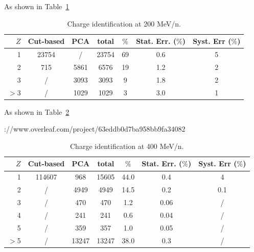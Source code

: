 \documentclass[utf8]{frontiersFPHY} %
\begin{document}
As shown in Table~\ref{tab:Charge_id_200}
%
\begin {table}
	\footnotesize
    \centering
    \caption{Charge identification at 200 MeV/n.}
    \hfill
    \begin{center}
    \begin{tabular}{r|cccccc} 
    \toprule
    \textbf{$Z$}   &  \textbf{Cut-based}   &   \textbf{PCA}   &   \textbf{total}   &   \textbf{$\%$} &   \textbf{Stat. Err. ($\%$)} & \textbf{Syst. Err ($\%$)}   \\
    \midrule
    1  &   23754   &   / &   23754   &  69 &  0.6 &  5 \\
    2  &   715  &   5861   &   6576  &  19 &  1.2 &  2 \\
    3  &   /   &   3093    &   3093   &  9 &  1.8 &  2 \\
    $>$3 & /   &   1029  &  1029  &     3 &  3.0 &  1 \\
    \midrule
    \end{tabular}
    \label{tab:Charge_id_200}
    \end{center}
\end {table}
%


As shown in Table~\ref{tab:Charge_id_400}

%
\begin {table}
	\footnotesize
    \centeringhttps://www.overleaf.com/project/63eddb0d7ba958bb9fa34082
    \caption{Charge identification at 400 MeV/n.}
    \hfill
    \begin{center}
    \begin{tabular}{r|cccccc} 
    \toprule
    \textbf{$Z$}   &  \textbf{Cut-based}   &   \textbf{PCA}   &   \textbf{total}   &   \textbf{$\%$} &   \textbf{Stat. Err. ($\%$)} & \textbf{Syst. Err ($\%$)}   \\
    \midrule
    1  &   114607   &   968 &   15605   &  44.0 &  0.4 &  4 \\
    2  &   /   &   4949   &   4949  &     14.5 &  0.2 &  0.1 \\
    3  &   /   &   470    &   470   &     1.2  &  0.06 &  / \\
    4  &   /   &   241    &   241   &     0.6  &  0.04 &  / \\
    5  &   /   &   359    &   357   &     1.0  &  0.05 &  / \\
    $>$5 & /   &   13247  &  13247  &     38.0 &  0.3 &  / \\
    \midrule
    \end{tabular}
    \label{tab:Charge_id_400}
    \end{center}
\end {table}
%
\end{document}
